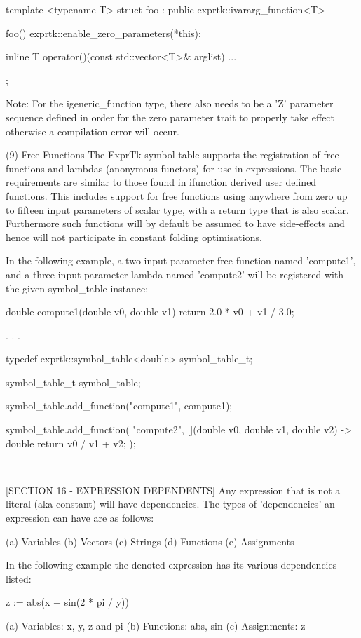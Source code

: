 template <typename T>
struct foo : public exprtk::ivararg\_function<T>
{
foo()
{
	exprtk::enable\_zero\_parameters(*this);
}

inline T operator()(const std::vector<T>\& arglist)
{ ... }
};


Note: For  the igeneric\_function  type, there  also needs  to be a 'Z'
parameter sequence  defined in order for the  zero parameter  trait to
properly take effect otherwise a compilation error will occur.


(9) Free Functions
The ExprTk symbol  table supports the  registration of free  functions
and lambdas  (anonymous functors)  for use  in expressions.  The basic
requirements  are similar  to those  found in  ifunction derived  user
defined  functions. This  includes  support  for free  functions using
anywhere from zero up to fifteen input parameters of scalar type, with
a return type that is also scalar. Furthermore such functions will  by
default be assumed to have side-effects and hence will not participate
in constant folding optimisations.

In the following  example, a two  input parameter free  function named
'compute1', and a three  input parameter lambda named  'compute2' will
be registered with the given symbol\_table instance:


double compute1(double v0, double v1)
{
return 2.0 * v0 + v1 / 3.0;
}

.
.
.

typedef exprtk::symbol\_table<double> symbol\_table\_t;

symbol\_table\_t symbol\_table;

symbol\_table.add\_function("compute1", compute1);

symbol\_table.add\_function(
"compute2",
[](double v0, double v1, double v2) -> double
{ return v0 / v1 + v2; });

~~~~~~~~~~~~~~~~~~~~~~~~~~~~~~~~~~~~~~~~~~~~~~~~~~~~~~~~~~

[SECTION 16 - EXPRESSION DEPENDENTS]
Any  expression  that  is  not  a  literal  (aka  constant)  will have
dependencies. The types of  'dependencies' an expression can  have are
as follows:

(a) Variables
(b) Vectors
(c) Strings
(d) Functions
(e) Assignments


In  the  following  example the  denoted  expression  has its  various
dependencies listed:

z := abs(x + sin(2 * pi / y))

(a) Variables:   x, y, z and pi
(b) Functions:   abs, sin
(c) Assignments: z


